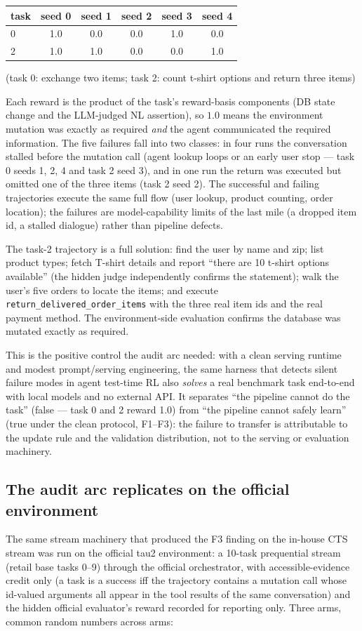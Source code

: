 \begin{center}
\small
\begin{tabular}{lccccc}
\toprule
task & seed 0 & seed 1 & seed 2 & seed 3 & seed 4 \\
\midrule
0 & 1.0 & 0.0 & 0.0 & 1.0 & 0.0 \\
2 & 1.0 & 1.0 & 0.0 & 0.0 & 1.0 \\
\bottomrule
\end{tabular}
\end{center}
\noindent (task 0: exchange two items; task 2: count t-shirt options and
return three items)

Each reward is the product of the task's reward-basis components (DB
state change and the LLM-judged NL assertion), so $1.0$ means the
environment mutation was exactly as required \emph{and} the agent
communicated the required information. The five failures fall into two
classes: in four runs the conversation stalled before the mutation call
(agent lookup loops or an early user stop --- task 0 seeds 1, 2, 4 and
task 2 seed 3), and in one run the return was executed but omitted one
of the three items (task 2 seed 2). The successful and failing
trajectories execute the same full flow (user lookup, product counting,
order location); the failures are model-capability limits of the last
mile (a dropped item id, a stalled dialogue) rather than pipeline
defects.

The task-2 trajectory is a full solution: find the user by name and zip;
list product types; fetch T-shirt details and report ``there are 10
t-shirt options available'' (the hidden judge independently confirms the
statement); walk the user's five orders to locate the items; and execute
\texttt{return\_delivered\_order\_items} with the three real item ids and
the real payment method. The environment-side evaluation confirms the
database was mutated exactly as required.

This is the positive control the audit arc needed: with a clean serving
runtime and modest prompt/serving engineering, the same harness that
detects silent failure modes in agent test-time RL also \emph{solves} a
real benchmark task end-to-end with local models and no external API. It
separates ``the pipeline cannot do the task'' (false --- task 0 and 2
reward 1.0) from ``the pipeline cannot safely learn'' (true under the
clean protocol, F1--F3): the failure to transfer is attributable to the
update rule and the validation distribution, not to the serving or
evaluation machinery.

\subsection{The audit arc replicates on the official environment}
The same stream machinery that produced the F3 finding on the in-house
CTS stream was run on the official tau2 environment: a 10-task
prequential stream (retail base tasks 0--9) through the official
orchestrator, with accessible-evidence credit only (a task is a success
iff the trajectory contains a mutation call whose id-valued arguments
all appear in the tool results of the same conversation) and the hidden
official evaluator's reward recorded for reporting only. Three arms,
common random numbers across arms:

